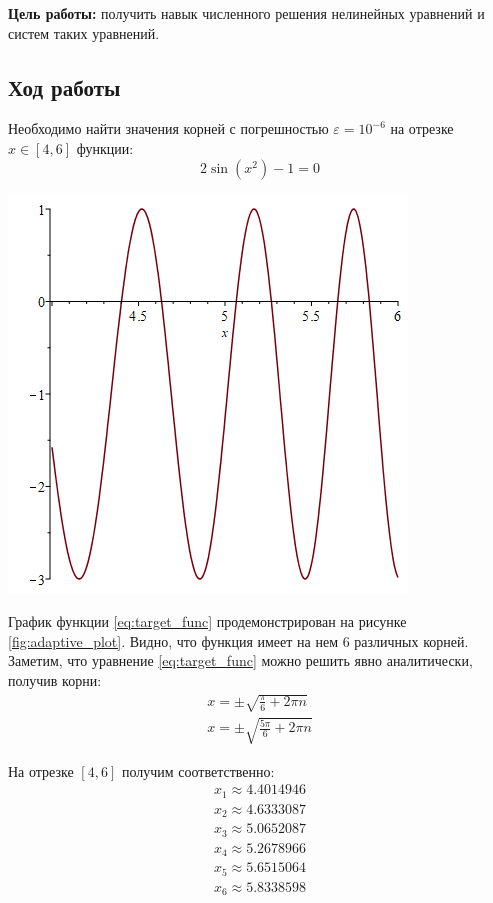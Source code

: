 \documentclass[a4paper, fontsize=14pt]{article}
\begin{document}
\textbf{Цель работы:} получить навык численного решения нелинейных уравнений и систем таких уравнений.
\subsection*{{Ход работы}}

Необходимо найти значения корней с погрешностью $\varepsilon = 10^{-6}$ на отрезке $x\in[4,6]$ функции: 
\begin{equation}
    \label{eq:target_func}
    2 \sin(x^2) - 1 = 0
\end{equation}

\begin{center}
    \includegraphics[scale=0.6]{src/target_plot.png}
    \label{fig:target_plot}
\end{center}

График функции \eqref{eq:target_func} продемонстрирован на рисунке \ref{fig:adaptive_plot}. Видно, что функция имеет на нем 6 различных корней. 
Заметим, что уравнение \eqref{eq:target_func} можно решить явно аналитически, получив корни:
\begin{equation*}
    \begin{aligned}
        x = \pm \sqrt{\frac{\pi}{6} + 2 \pi n} \\
        x = \pm \sqrt{\frac{5 \pi}{6} + 2 \pi n}
    \end{aligned}
\end{equation*}

На отрезке $[4, 6]$ получим соответственно:
\begin{equation*}
    \begin{aligned}
        x_1 \approx 4.4014946\\
        x_2 \approx 4.6333087\\
        x_3 \approx 5.0652087\\
        x_4 \approx 5.2678966\\
        x_5 \approx 5.6515064\\
        x_6 \approx 5.8338598
    \end{aligned}
\end{equation*}
\end{document}
